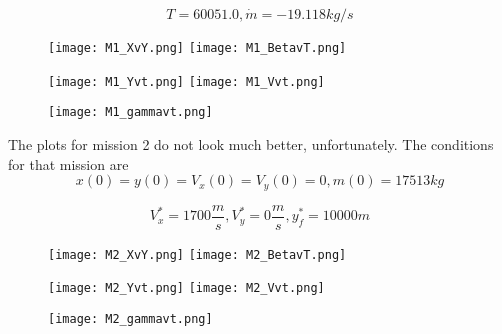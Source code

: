 \documentclass{article}
\begin{document}
\begin{equation*}
T = 60051.0 , \dot{m} = -19.118 kg/s
\end{equation*}

\begin{figure} 
\texttt{[image: M1\_XvY.png]}
\texttt{[image: M1\_BetavT.png]}

\end{figure}

\begin{figure}
\texttt{[image: M1\_Yvt.png]}
\texttt{[image: M1\_Vvt.png]}

\end{figure}

\begin{figure} 
\texttt{[image: M1\_gammavt.png]}
\end{figure}

\clearpage
The plots for mission 2 do not look much better, unfortunately. 
The conditions for that mission are
\begin{equation*}
x(0) = y(0) = V_x(0) = V_y(0) = 0 ,m(0) = 17513kg
\end{equation*}

\begin{equation*}
V_x^* = 1700 \frac{m}{s}, V_y^* = 0 \frac{m}{s} , y_f^* = 10000 m 
\end{equation*}

\begin{figure} 
\texttt{[image: M2\_XvY.png]}
\texttt{[image: M2\_BetavT.png]}

\end{figure}

\begin{figure} 
\texttt{[image: M2\_Yvt.png]}
\texttt{[image: M2\_Vvt.png]}
\end{figure}

\begin{figure} 
\texttt{[image: M2\_gammavt.png]}
\end{figure}
\end{document}
